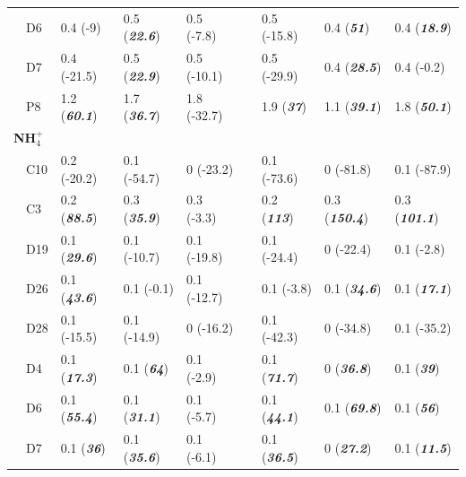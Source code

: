 \documentclass[letterpaper,12pt,oneside]{article}\usepackage[]{graphicx}\usepackage[]{color}
\begin{document}
\begin{table}[!tbp]
\begin{center}
\begin{tabular}{llllclll}
~~D6&0.4 \footnotesize{(-9)}&0.5 \footnotesize{(\textit{\textbf{22.6}})}&0.5 \footnotesize{(-7.8)}&&0.5 \footnotesize{(-15.8)}&0.4 \footnotesize{(\textit{\textbf{51}})}&0.4 \footnotesize{(\textit{\textbf{18.9}})}\tabularnewline
~~D7&0.4 \footnotesize{(-21.5)}&0.5 \footnotesize{(\textit{\textbf{22.9}})}&0.5 \footnotesize{(-10.1)}&&0.5 \footnotesize{(-29.9)}&0.4 \footnotesize{(\textit{\textbf{28.5}})}&0.4 \footnotesize{(-0.2)}\tabularnewline
~~P8&1.2 \footnotesize{(\textit{\textbf{60.1}})}&1.7 \footnotesize{(\textit{\textbf{36.7}})}&1.8 \footnotesize{(-32.7)}&&1.9 \footnotesize{(\textit{\textbf{37}})}&1.1 \footnotesize{(\textit{\textbf{39.1}})}&1.8 \footnotesize{(\textit{\textbf{50.1}})}\tabularnewline
\hline
{\bfseries NH$_{4}^{+}$}&&&&&&&\tabularnewline
~~C10&0.2 \footnotesize{(-20.2)}&0.1 \footnotesize{(-54.7)}&0 \footnotesize{(-23.2)}&&0.1 \footnotesize{(-73.6)}&0 \footnotesize{(-81.8)}&0.1 \footnotesize{(-87.9)}\tabularnewline
~~C3&0.2 \footnotesize{(\textit{\textbf{88.5}})}&0.3 \footnotesize{(\textit{\textbf{35.9}})}&0.3 \footnotesize{(-3.3)}&&0.2 \footnotesize{(\textit{\textbf{113}})}&0.3 \footnotesize{(\textit{\textbf{150.4}})}&0.3 \footnotesize{(\textit{\textbf{101.1}})}\tabularnewline
~~D19&0.1 \footnotesize{(\textit{\textbf{29.6}})}&0.1 \footnotesize{(-10.7)}&0.1 \footnotesize{(-19.8)}&&0.1 \footnotesize{(-24.4)}&0 \footnotesize{(-22.4)}&0.1 \footnotesize{(-2.8)}\tabularnewline
~~D26&0.1 \footnotesize{(\textit{\textbf{43.6}})}&0.1 \footnotesize{(-0.1)}&0.1 \footnotesize{(-12.7)}&&0.1 \footnotesize{(-3.8)}&0.1 \footnotesize{(\textit{\textbf{34.6}})}&0.1 \footnotesize{(\textit{\textbf{17.1}})}\tabularnewline
~~D28&0.1 \footnotesize{(-15.5)}&0.1 \footnotesize{(-14.9)}&0 \footnotesize{(-16.2)}&&0.1 \footnotesize{(-42.3)}&0 \footnotesize{(-34.8)}&0.1 \footnotesize{(-35.2)}\tabularnewline
~~D4&0.1 \footnotesize{(\textit{\textbf{17.3}})}&0.1 \footnotesize{(\textit{\textbf{64}})}&0.1 \footnotesize{(-2.9)}&&0.1 \footnotesize{(\textit{\textbf{71.7}})}&0 \footnotesize{(\textit{\textbf{36.8}})}&0.1 \footnotesize{(\textit{\textbf{39}})}\tabularnewline
~~D6&0.1 \footnotesize{(\textit{\textbf{55.4}})}&0.1 \footnotesize{(\textit{\textbf{31.1}})}&0.1 \footnotesize{(-5.7)}&&0.1 \footnotesize{(\textit{\textbf{44.1}})}&0.1 \footnotesize{(\textit{\textbf{69.8}})}&0.1 \footnotesize{(\textit{\textbf{56}})}\tabularnewline
~~D7&0.1 \footnotesize{(\textit{\textbf{36}})}&0.1 \footnotesize{(\textit{\textbf{35.6}})}&0.1 \footnotesize{(-6.1)}&&0.1 \footnotesize{(\textit{\textbf{36.5}})}&0 \footnotesize{(\textit{\textbf{27.2}})}&0.1 \footnotesize{(\textit{\textbf{11.5}})}\tabularnewline

\end{tabular}
\end{center}
\end{table}
\end{document}
